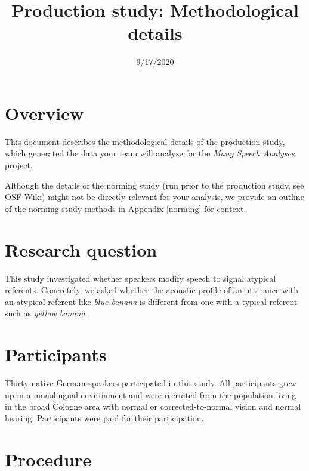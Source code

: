 \documentclass[
]{article}
\title{Production study: Methodological details}
\author{}
\date{\vspace{-2.5em}9/17/2020}
\begin{document}
\maketitle

{
\setcounter{tocdepth}{2}
\tableofcontents
}
\hypertarget{overview}{%
\section{Overview}\label{overview}}

This document describes the methodological details of the production study, which generated the data your team will analyze for the \emph{Many Speech Analyses} project.

Although the details of the norming study (run prior to the production study, see OSF Wiki) might not be directly relevant for your analysis, we provide an outline of the norming study methods in Appendix \ref{norming} for context.

\hypertarget{research-question}{%
\section{Research question}\label{research-question}}

This study investigated whether speakers modify speech to signal atypical referents.
Concretely, we asked whether the acoustic profile of an utterance with an atypical referent like \emph{blue banana} is different from one with a typical referent such as \emph{yellow banana}.

\hypertarget{participants}{%
\section{Participants}\label{participants}}

Thirty native German speakers participated in this study.
All participants grew up in a monolingual environment and were recruited from the population living in the broad Cologne area with normal or corrected-to-normal vision and normal hearing.
Participants were paid for their participation.

\hypertarget{procedure}{%
\section{Procedure}\label{procedure}}
\end{document}
